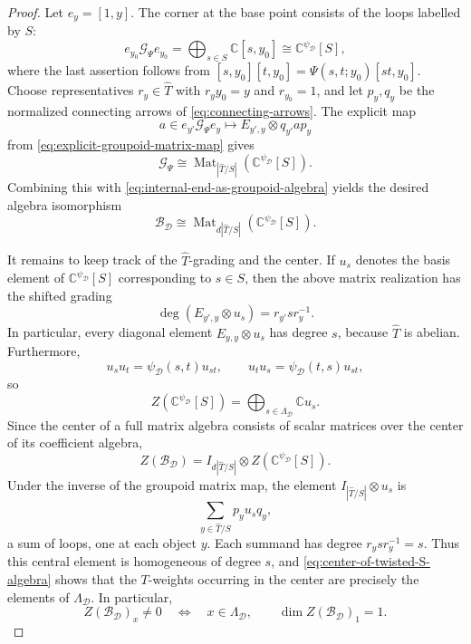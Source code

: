 \documentclass{amsart}
\theoremstyle{definition}
\numberwithin{equation}{section}
\begin{document}
\begin{proof}
Let $e_y=[1,y]$.  The corner at the base point consists of the loops labelled by
$S$:
\begin{equation}\label{eq:isotropy-corner-S}
 e_{y_0}\mathcal G_{\Psi}e_{y_0}
 =\bigoplus_{s\in S}\mathbb C[s,y_0]
 \cong\mathbb C^{\psi_{\mathcal D}}[S],
\end{equation}
where the last assertion follows from
$[s,y_0][t,y_0]=\Psi(s,t;y_0)[st,y_0]$.
Choose representatives $r_y\in \widehat{T}$ with $r_yy_0=y$ and $r_{y_0}=1$, and let
$p_y,q_y$ be the normalized connecting arrows of
\eqref{eq:connecting-arrows}.  The explicit map
\[
 a\in e_{y'}\mathcal G_{\Psi}e_y
 \longmapsto
 E_{y',y}\otimes q_{y'}ap_y
\]
from \eqref{eq:explicit-groupoid-matrix-map} gives
\[
 \mathcal G_{\Psi}
 \cong
 \operatorname{Mat}_{|\widehat{T}/S|}\!\left(
   \mathbb C^{\psi_{\mathcal D}}[S]
 \right).
\]
Combining this with \eqref{eq:internal-end-as-groupoid-algebra} yields the desired
algebra isomorphism
\begin{equation}\label{eq:internal-end-matrix-algebra}
 \mathcal B_{\mathcal D}
 \cong
 \operatorname{Mat}_{d|\widehat{T}/S|}\!\left(\mathbb C^{\psi_{\mathcal D}}[S]\right).
\end{equation}

It remains to keep track of the $\widehat{T}$-grading and the center.  If $u_s$ denotes the
basis element of $\mathbb C^{\psi_{\mathcal D}}[S]$ corresponding to $s\in S$,
then the above matrix realization has the shifted grading
\begin{equation}\label{eq:shifted-matrix-grading}
 \deg(E_{y',y}\otimes u_s)=r_{y'}sr_y^{-1}.
\end{equation}
In particular, every diagonal element $E_{y,y}\otimes u_s$ has degree $s$,
because $\widehat{T}$ is abelian.  Furthermore,
\[
 u_su_t=\psi_{\mathcal D}(s,t)u_{st},
 \qquad
 u_tu_s=\psi_{\mathcal D}(t,s)u_{st},
\]
so
\begin{equation}\label{eq:center-of-twisted-S-algebra}
 Z\!\left(\mathbb C^{\psi_{\mathcal D}}[S]\right)
 =\bigoplus_{s\in\Lambda_{\mathcal D}}\mathbb C u_s.
\end{equation}
Since the center of a full matrix algebra consists of scalar matrices over the
center of its coefficient algebra,
\[
 Z(\mathcal B_{\mathcal D})
 =I_{d|\widehat{T}/S|}\otimes
  Z\!\left(\mathbb C^{\psi_{\mathcal D}}[S]\right).
\]
Under the inverse of the groupoid matrix map, the element
$I_{|\widehat{T}/S|}\otimes u_s$ is
\[
 \sum_{y\in \widehat{T}/S}p_yu_sq_y,
\]
a sum of loops, one at each object $y$.  Each summand has degree
$r_ysr_y^{-1}=s$.  Thus this central element is homogeneous of degree $s$, and
\eqref{eq:center-of-twisted-S-algebra} shows that the $T$-weights occurring in the
center are precisely the elements of $\Lambda_{\mathcal D}$.  In particular,
\begin{equation}\label{eq:center-weights}
 Z(\mathcal B_{\mathcal D})_x\neq0
 \quad\Longleftrightarrow\quad
 x\in\Lambda_{\mathcal D},
 \qquad
 \dim Z(\mathcal B_{\mathcal D})_1=1.
\end{equation}


\end{proof}
\end{document}
